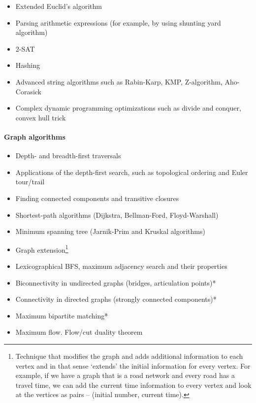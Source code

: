 \documentclass[12pt]{article}
\begin{document}
		\begin{itemize}[label=]
			\item Extended Euclid’s algorithm
			\item Parsing arithmetic expressions (for example, by using shunting yard algorithm)
			\item 2-SAT
			\item Hashing
			\item Advanced string algorithms such as Rabin-Karp, KMP, Z-algorithm, Aho-Corasick
			\item Complex dynamic programming optimizations such as divide and conquer, convex hull trick
		\end{itemize}
	
		\paragraph{Graph algorithms}
		\begin{itemize}[label=]
			\item Depth- and breadth-first traversals
			\item Applications of the depth-first search, such as topological ordering and Euler tour/trail
			\item Finding connected components and transitive closures
			\item Shortest-path algorithms (Dijkstra, Bellman-Ford, Floyd-Warshall)
			\item Minimum spanning tree (Jarnik-Prim and Kruskal algorithms)
			\item Graph extension\footnote{Technique that modifies the graph and adds additional information to each vertex and in that sense ‘extends’ the initial information for every vertex. For example, if we have a graph that is a road network and every road has a travel time, we can add the current time information to every vertex and look at the vertices as pairs -- (initial number, current time).}
		\end{itemize}
	
		\begin{itemize}[label=]
			\item Lexicographical BFS, maximum adjacency search and their properties
			\item Biconnectivity in undirected graphs (bridges, articulation points)*
			\item Connectivity in directed graphs (strongly connected components)*
			\item Maximum bipartite matching*
			\item Maximum flow. Flow/cut duality theorem
		\end{itemize}
		
\end{document}
